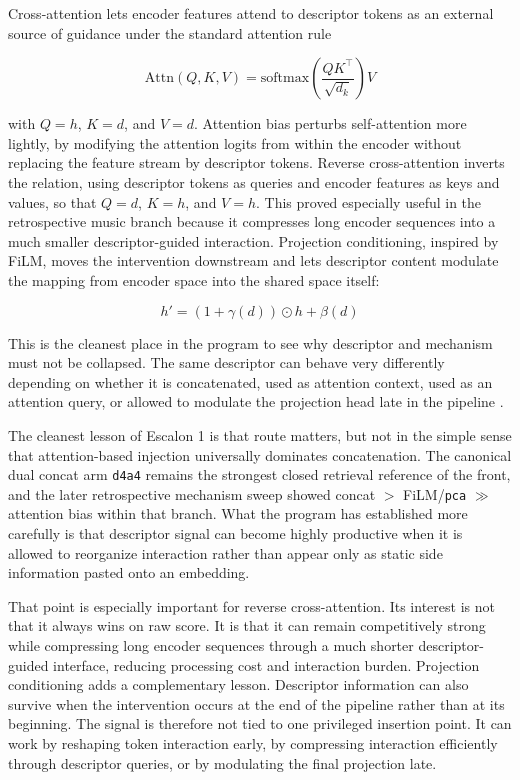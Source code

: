 Cross-attention lets encoder features attend to descriptor tokens as an external source of guidance under the standard attention rule

$$
\mathrm{Attn}(Q,K,V) = \mathrm{softmax}\left(\frac{QK^{\top}}{\sqrt{d_k}}\right)V
$$

with \(Q=h\), \(K=d\), and \(V=d\). Attention bias perturbs self-attention more lightly, by modifying the attention logits from within the encoder without replacing the feature stream by descriptor tokens. Reverse cross-attention inverts the relation, using descriptor tokens as queries and encoder features as keys and values, so that \(Q=d\), \(K=h\), and \(V=h\). This proved especially useful in the retrospective music branch because it compresses long encoder sequences into a much smaller descriptor-guided interaction. Projection conditioning, inspired by FiLM, moves the intervention downstream and lets descriptor content modulate the mapping from encoder space into the shared space itself:

$$
h' = (1 + \gamma(d)) \odot h + \beta(d)
$$

This is the cleanest place in the program to see why descriptor and mechanism must not be collapsed. The same descriptor can behave very differently depending on whether it is concatenated, used as attention context, used as an attention query, or allowed to modulate the projection head late in the pipeline \parencite{vaswani_2017,perez_2018}.

The cleanest lesson of Escalon 1 is that route matters, but not in the simple sense that attention-based injection universally dominates concatenation. The canonical dual concat arm \texttt{d4a4} remains the strongest closed retrieval reference of the front, and the later retrospective mechanism sweep showed concat $>$ FiLM/\texttt{pca} $\gg$ attention bias within that branch. What the program has established more carefully is that descriptor signal can become highly productive when it is allowed to reorganize interaction rather than appear only as static side information pasted onto an embedding.

That point is especially important for reverse cross-attention. Its interest is not that it always wins on raw score. It is that it can remain competitively strong while compressing long encoder sequences through a much shorter descriptor-guided interface, reducing processing cost and interaction burden. Projection conditioning adds a complementary lesson. Descriptor information can also survive when the intervention occurs at the end of the pipeline rather than at its beginning. The signal is therefore not tied to one privileged insertion point. It can work by reshaping token interaction early, by compressing interaction efficiently through descriptor queries, or by modulating the final projection late.

